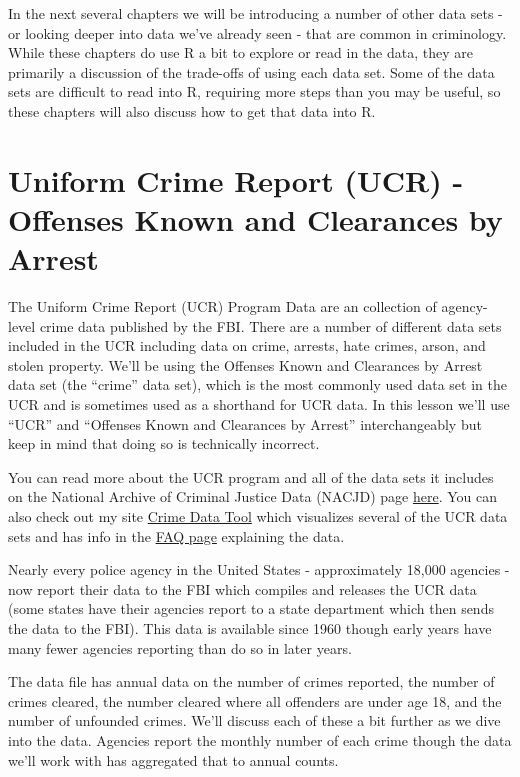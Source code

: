 \documentclass[
  12pt,
]{book}
\begin{document}
In the next several chapters we will be introducing a number of other data sets - or looking deeper into data we've already seen - that are common in criminology. While these chapters do use R a bit to explore or read in the data, they are primarily a discussion of the trade-offs of using each data set. Some of the data sets are difficult to read into R, requiring more steps than you may be useful, so these chapters will also discuss how to get that data into R.

\hypertarget{ucr}{%
\chapter{Uniform Crime Report (UCR) - Offenses Known and Clearances by Arrest}\label{ucr}}

The Uniform Crime Report (UCR) Program Data are an collection of agency-level crime data published by the FBI. There are a number of different data sets included in the UCR including data on crime, arrests, hate crimes, arson, and stolen property. We'll be using the Offenses Known and Clearances by Arrest data set (the ``crime'' data set), which is the most commonly used data set in the UCR and is sometimes used as a shorthand for UCR data. In this lesson we'll use ``UCR'' and ``Offenses Known and Clearances by Arrest'' interchangeably but keep in mind that doing so is technically incorrect.

You can read more about the UCR program and all of the data sets it includes on the National Archive of Criminal Justice Data (NACJD) page \href{https://www.icpsr.umich.edu/icpsrweb/content/NACJD/guides/ucr.html}{here}. You can also check out my site \href{http://crimedatatool.com}{Crime Data Tool} which visualizes several of the UCR data sets and has info in the \href{http://crimedatatool.com/faq.html}{FAQ page} explaining the data.

Nearly every police agency in the United States - approximately 18,000 agencies - now report their data to the FBI which compiles and releases the UCR data (some states have their agencies report to a state department which then sends the data to the FBI). This data is available since 1960 though early years have many fewer agencies reporting than do so in later years.

The data file has annual data on the number of crimes reported, the number of crimes cleared, the number cleared where all offenders are under age 18, and the number of unfounded crimes. We'll discuss each of these a bit further as we dive into the data. Agencies report the monthly number of each crime though the data we'll work with has aggregated that to annual counts.
\end{document}

